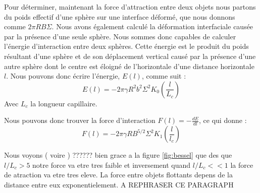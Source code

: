         Pour déterminer, maintenant la force d'attraction entre deux objets nous partons du poids effectif d'une sphère sur une interface déformé, que nous donnons comme \(2\pi RB\Sigma\). Nous avons également calculé la déformation interfaciale causée
        par la présence d'une seule sphère. Nous sommes donc capables de calculer l'énergie d'interaction entre deux sphères. Cette énergie est le produit du poids résultant d'une sphère et de son déplacement vertical causé par la présence d'une autre sphère dont le centre est éloigné de l'horizontale d'une distance horizontale $l$. Nous pouvons donc écrire l'énergie, $E(l)$, comme suit :
        \begin{equation}
            E(l)=-2\pi\gamma R^2b^2\Sigma^2K_0\left(\frac{l}{L_c}\right)
            \label{eq:energyInteraction}
        \end{equation}
        Avec $L_c$ la longueur capillaire.

        Nous pouvons donc trouver la force d'interaction $F(l)=-\frac{dE}{dl}$, ce qui donne :
        \begin{equation}
            \boxed{
                F(l)=-2\pi\gamma RB^{5/2}\Sigma^2K_1\left(\frac{l}{l_c}\right)
            }
            \label{eq:ForceInteraction}
        \end{equation}

        Nous voyons ( voire ) ?????? bien grace a la figure \ref{fig:bessel} que des que $l/L_c>5$ notre force va etre tres faible et inversement quand $l/L_c << 1 $ la force de atraction va etre tres eleve. La force entre objets flottants depens de la distance entre eux exponentielement. A REPHRASER CE PARAGRAPH 

        
        


